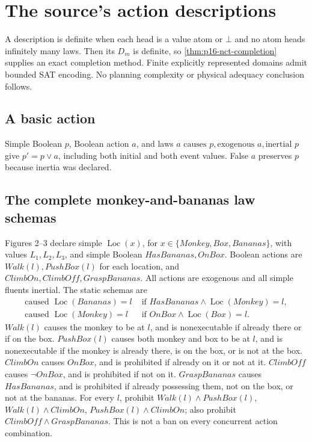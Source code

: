 \section{The source's action descriptions}
\label{sec:p16-cplus-cases}

A description is definite when each head is a value atom or \(\bot\)
and no atom heads infinitely many laws. Then its \(D_m\) is definite,
so \cref{thm:p16-nct-completion} supplies an exact completion method.
Finite explicitly represented domains admit bounded SAT encoding.
No planning complexity or physical adequacy conclusion follows.

\subsection{A basic action}
Simple Boolean \(p\), Boolean action \(a\), and laws
\(a\text{ causes }p,\text{exogenous }a,\text{inertial }p\)
give \(p'=p\lor a\), including both initial and both event values.
False \(a\) preserves \(p\) because inertia was declared.

\subsection{The complete monkey-and-bananas law schemas}
Figures 2--3 declare simple \(\operatorname{Loc}(x)\), for
\(x\in\{Monkey,Box,Bananas\}\), with values \(L_1,L_2,L_3\), and simple
Boolean \(HasBananas,OnBox\).
Boolean actions are \(Walk(l),PushBox(l)\) for each location, and
\(ClimbOn,ClimbOff,GraspBananas\).
All actions are exogenous and all simple fluents inertial.
The static schemas are
\[
\begin{split}
 \text{caused }\operatorname{Loc}(Bananas)=l
   &\text{ if }HasBananas\land\operatorname{Loc}(Monkey)=l,\\
 \text{caused }\operatorname{Loc}(Monkey)=l
   &\text{ if }OnBox\land\operatorname{Loc}(Box)=l.
\end{split}
\]
\(Walk(l)\) causes the monkey to be at \(l\), and is nonexecutable if
already there or if on the box.
\(PushBox(l)\) causes both monkey and box to be at \(l\), and is
nonexecutable if the monkey is already there, is on the box, or is
not at the box.
\(ClimbOn\) causes \(OnBox\), and is prohibited if already on it or
not at it. \(ClimbOff\) causes \(\neg OnBox\), and is prohibited if
not on it. \(GraspBananas\) causes \(HasBananas\), and is prohibited
if already possessing them, not on the box, or not at the bananas.
For every \(l\), prohibit \(Walk(l)\land PushBox(l)\),
\(Walk(l)\land ClimbOn\), \(PushBox(l)\land ClimbOn\);
also prohibit \(ClimbOff\land GraspBananas\).
This is not a ban on every concurrent action combination.

